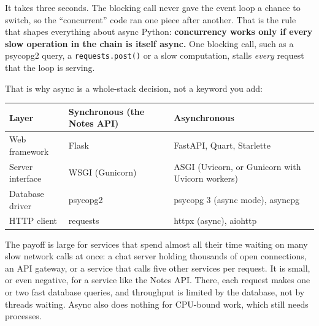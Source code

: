 \noindent{}It takes three seconds. The blocking call never gave the event loop a chance to switch, so the ``concurrent'' code ran one piece after another. That is the rule that shapes everything about async Python: \textbf{concurrency works only if every slow operation in the chain is itself async.} One blocking call, such as a psycopg2 query, a \texttt{requests.post()} or a slow computation, stalls \emph{every} request that the loop is serving.

That is why async is a whole-stack decision, not a keyword you add:


{\def\LTcaptype{none} %
\begin{longtable}[]{@{}
  >{\raggedright\arraybackslash}p{}
  >{\raggedright\arraybackslash}p{}
  >{\raggedright\arraybackslash}p{}@{}}
\toprule\noalign{}
\begin{minipage}[b]{\linewidth}\raggedright
Layer
\end{minipage} & \begin{minipage}[b]{\linewidth}\raggedright
Synchronous (the Notes API)
\end{minipage} & \begin{minipage}[b]{\linewidth}\raggedright
Asynchronous
\end{minipage} \\
\midrule\noalign{}
\endhead
\bottomrule\noalign{}
\endlastfoot
Web framework & Flask & FastAPI, Quart, Starlette \\
Server interface & WSGI (Gunicorn) & ASGI (Uvicorn, or Gunicorn with Uvicorn workers) \\
Database driver & psycopg2 & psycopg 3 (async mode), asyncpg \\
HTTP client & requests & httpx (async), aiohttp \\
\end{longtable}
}

The payoff is large for services that spend almost all their time waiting on many slow network calls at once: a chat server holding thousands of open connections, an API gateway, or a service that calls five other services per request. It is small, or even negative, for a service like the Notes API. There, each request makes one or two fast database queries, and throughput is limited by the database, not by threads waiting. Async also does nothing for CPU-bound work, which still needs processes.

